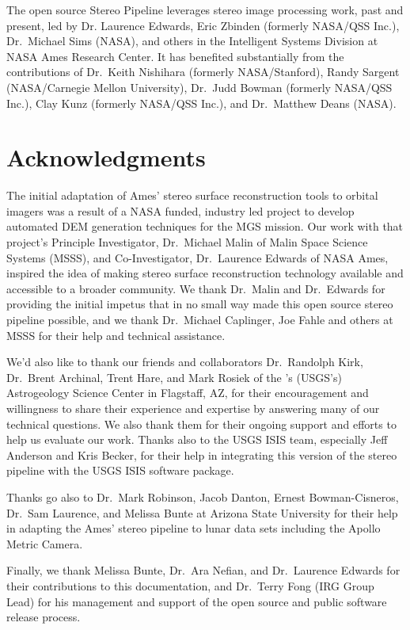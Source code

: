 The open source Stereo Pipeline leverages stereo image processing
work, past and present, led by Dr. Laurence Edwards, Eric Zbinden
(formerly NASA/QSS Inc.), Dr.~Michael Sims (NASA), and others in the
Intelligent Systems Division at NASA Ames Research Center. It has
benefited substantially from the contributions of Dr.~Keith Nishihara
(formerly NASA/Stanford), Randy Sargent (NASA/Carnegie Mellon
University), Dr.~Judd Bowman (formerly NASA/QSS Inc.), Clay Kunz
(formerly NASA/QSS Inc.), and Dr.~Matthew Deans (NASA).

\section*{Acknowledgments}

The initial adaptation of Ames' stereo surface reconstruction tools to
orbital imagers was a result of a NASA funded, industry led project to
develop automated \ac{DEM} generation techniques for
the \ac{MGS} mission. Our work with that project's
Principle Investigator, Dr.~Michael Malin of Malin Space Science
Systems (MSSS), and Co-Investigator, Dr.~Laurence Edwards of NASA
Ames, inspired the idea of making stereo surface reconstruction
technology available and accessible to a broader community.  We thank
Dr.~Malin and Dr.~Edwards for providing the initial impetus that in no
small way made this open source stereo pipeline possible, and we thank
Dr.~Michael Caplinger, Joe Fahle and others at MSSS for their help and
technical assistance.

We'd also like to thank our friends and collaborators Dr.~Randolph
Kirk, Dr.~Brent Archinal, Trent Hare, and Mark Rosiek of the 
's (\acs{USGS}'s) Astrogeology Science Center in
Flagstaff, AZ, for their encouragement and willingness to share
their experience and expertise by answering many of our technical
questions.  We also thank them for their ongoing support and efforts
to help us evaluate our work.  Thanks also to the \ac{USGS} \ac{ISIS} team,
especially Jeff Anderson and Kris Becker, for their help in integrating
this version of the stereo pipeline with the \ac{USGS} \ac{ISIS} software
package.

Thanks go also to Dr.~Mark Robinson, Jacob Danton, Ernest
Bowman-Cisneros, Dr.~Sam Laurence, and Melissa Bunte at Arizona State
University for their help in adapting the Ames' stereo pipeline to
lunar data sets including the Apollo Metric Camera.

Finally, we thank Melissa Bunte, Dr.~Ara Nefian, and Dr.~Laurence
Edwards for their contributions to this documentation, and Dr.~Terry
Fong (IRG Group Lead) for his management and support of the open
source and public software release process.

